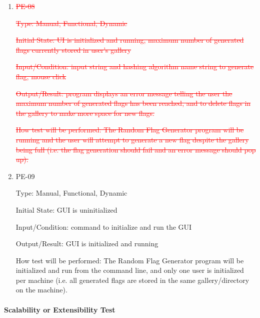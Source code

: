 \documentclass[12pt, titlepage]{article}
\begin{document}
\begin{enumerate}

\item{\textcolor{red}{\sout{PE-08}}\\}

\textcolor{red}{\sout{Type: Manual, Functional, Dynamic}}

\textcolor{red}{\sout{Initial State: UI is initialized and running, maximum
number of generated flags currently stored in user's gallery}}

\textcolor{red}{\sout{Input/Condition: input string and hashing algorithm name
string to generate flag, mouse click}}

\textcolor{red}{\sout{Output/Result: program displays an error message telling
the user the maximum number of generated flags has been reached, and to delete
flags in the gallery to make more space for new flags.}}

\textcolor{red}{\sout{How test will be performed: The Random Flag Generator
program will be running and the user will attempt to generate a new flag
despite the gallery being full (i.e. the flag generation should fail and an
error message should pop up).}}

\item{PE-09\\}

Type: Manual, Functional, Dynamic

Initial State: GUI is uninitialized

Input/Condition: command to initialize and run the GUI

Output/Result: GUI is initialized and running

How test will be performed: The Random Flag Generator program will be
initialized and run from the command line, and only one user is initialized
per machine (i.e. all generated flags are stored in the same gallery/directory
on the machine).

\end{enumerate}

\paragraph{Scalability or Extensibility Test}
\end{document}
